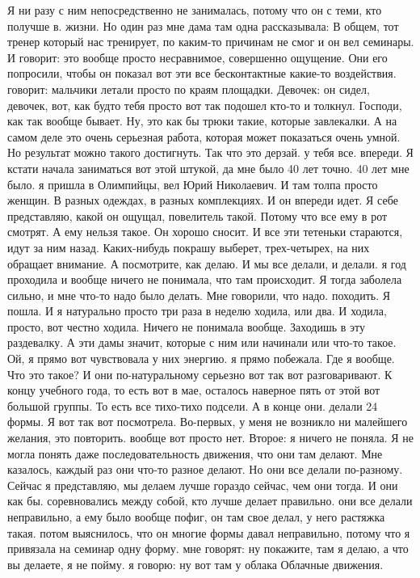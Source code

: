 Я ни разу с ним непосредственно не занималась, потому что он
с теми, кто получше в.
жизни.
Но один раз мне дама там одна рассказывала:
В общем, тот тренер который нас тренирует, по каким-то причинам не смог и он вел семинары.
И говорит: это вообще просто несравнимое, совершенно ощущение.
Они его попросили, чтобы он показал вот эти все бесконтактные какие-то воздействия.
говорит: мальчики летали просто по краям площадки.
Девочек: он сидел, девочек, вот, как будто тебя просто вот так подошел кто-то и толкнул.
Господи, как так вообще бывает.
Ну, это как бы трюки такие, которые завлекалки.
А на самом деле это очень серьезная работа, которая может показаться очень умной.
Но результат можно такого достигнуть.
Так что это дерзай.
у тебя все.
впереди.
Я кстати начала заниматься вот этой штукой, да мне было 40 лет точно.
40 лет мне было. я пришла в Олимпийцы, вел Юрий Николаевич.
И там толпа просто женщин.
В разных одеждах, в разных комплекциях.
И он впереди идет.
Я себе представляю, какой он ощущал, повелитель такой.
Потому что все ему в рот смотрят.
А ему нельзя такое.
Он хорошо сносит.
И все эти тетеньки стараются, идут за ним назад.
Каких-нибудь покрашу выберет, трех-четырех, на них обращает внимание.
А посмотрите, как делаю.
И мы все делали, и делали. я год проходила и вообще ничего не понимала, что там происходит.
Я тогда заболела сильно, и мне что-то надо было делать.
Мне говорили, что надо.
походить.
Я пошла.
И я натурально просто три раза в неделю ходила, или два.
И ходила, просто, вот честно ходила.
Ничего не понимала вообще.
Заходишь в эту раздевалку.
А эти дамы значит, которые с ним или начинали или что-то такое.
Ой, я прямо вот чувствовала у них энергию. я прямо побежала.
Где я вообще.
Что это такое?
И они по-натуральному серьезно вот так вот разговаривают.
К концу учебного года, то есть вот в мае, осталось наверное пять от этой вот большой группы.
То есть все тихо-тихо подсели.
А в конце они.
делали 24 формы.
Я вот так вот посмотрела.
Во-первых, у меня не возникло ни малейшего желания, это повторить. вообще вот просто нет.
Второе: я ничего не поняла.
Я не могла понять даже последовательность движения, что они там делают.
Мне казалось, каждый раз они что-то разное делают.
Но они все делали по-разному.
Сейчас я представляю, мы делаем лучше гораздо сейчас, чем они тогда.
И они как бы.
соревновались между собой, кто лучше делает правильно. они все делали неправильно, а ему было вообще пофиг, он там свое делал, у него растяжка такая. потом выяснилось, что он многие формы давал неправильно, потому что я привязала на семинар одну форму.
мне говорят: ну покажите, там я делаю, а что вы делаете, я не пойму. я говорю: ну вот там у облака Облачные движения.
